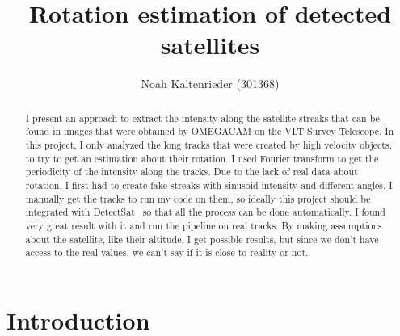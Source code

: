 \documentclass[a4paper,12pt,oneside]{report}
\title{Rotation estimation of detected satellites}
\author{Noah Kaltenrieder (301368)}
\begin{document}
\maketitle
{}
\makeacks

\begin{abstract}
I present an approach to extract the intensity along the satellite streaks that can be found in images that were obtained by OMEGACAM 
on the VLT Survey Telescope. In this project, I only analyzed the long tracks that were created by high velocity objects, to
try to get an estimation about their rotation. I used Fourier transform to get the periodicity of the intensity along the tracks.
Due to the lack of real data about rotation, I first had to create fake streaks with sinusoid intensity and different angles.
I manually get the tracks to run my code on them, so ideally this project should be integrated with DetectSat~\cite{detectsatRepo} so that all 
the process can be done automatically. I found very great result with it and run the pipeline on real tracks. By making assumptions about the satellite, 
like their altitude, I get possible results, but since we don't have access to the real values, we can't say if it is close to reality or not.
\end{abstract}


\maketoc

\chapter{Introduction}
\end{document}
